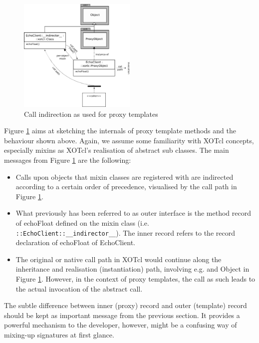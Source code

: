 \begin{figure}[htbp]
\begin{center}
\includegraphics[width=0.5\textwidth]{img/proxy-template.png}
\caption{Call indirection as used for proxy templates}
\label{fig:advanced:templates:1}
\end{center}
\end{figure}

Figure \ref{fig:advanced:templates:1} aims at sketching the internals of proxy template methods and the 
behaviour shown above. Again, we assume some familiarity with XOTcl concepts, especially mixins as 
XOTcl's realisation of abstract sub classes. The main messages from Figure \ref{fig:advanced:templates:1} are the following:
\begin{itemize}
\item Calls upon objects that mixin classes are registered with are indirected according to a certain order 
of precedence, visualised by the call path in Figure  \ref{fig:advanced:templates:1}.
\item What previously has been referred to as outer interface is the method record of echoFloat defined 
on the mixin class (i.e. \lstinline!::EchoClient::__indirector__!). The inner record refers to the record 
declaration of echoFloat of EchoClient.
\item The original or native call path in XOTcl would continue along the inheritance and realisation 
(instantiation) path, involving e.g.  and Object in Figure  \ref{fig:advanced:templates:1}. 
However, in the context of proxy templates, the call as such leads to the actual invocation of the 
abstract call.
\end{itemize}
\begin{hints}
\item The subtle difference between inner (proxy) record and outer (template) record should be kept as important message from the previous section. It provides a powerful mechanism to the developer, however, might be a confusing way of mixing-up signatures at first glance.
\end{hints}
